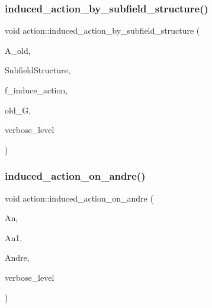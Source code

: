 \mbox{\label{classaction_add42951bdab176ceed6cc4af05dfa948}} 
\subsubsection{\texorpdfstring{induced\+\_\+action\+\_\+by\+\_\+subfield\+\_\+structure()}{induced\_action\_by\_subfield\_structure()}}
{\footnotesize\ttfamily void action\+::induced\+\_\+action\+\_\+by\+\_\+subfield\+\_\+structure (\begin{DoxyParamCaption}\item[{\mbox{\hyperlink{classaction}{action}} $\ast$}]{A\+\_\+old,  }\item[{\mbox{\hyperlink{classaction__by__subfield__structure}{action\+\_\+by\+\_\+subfield\+\_\+structure}} $\ast$}]{Subfield\+Structure,  }\item[{\mbox{\hyperlink{galois_8h_a09fddde158a3a20bd2dcadb609de11dc}{I\+NT}}}]{f\+\_\+induce\+\_\+action,  }\item[{\mbox{\hyperlink{classsims}{sims}} $\ast$}]{old\+\_\+G,  }\item[{\mbox{\hyperlink{galois_8h_a09fddde158a3a20bd2dcadb609de11dc}{I\+NT}}}]{verbose\+\_\+level }\end{DoxyParamCaption})}

\mbox{\label{classaction_a917efe5d7ae49b86dbf397540939fea4}} 
\subsubsection{\texorpdfstring{induced\+\_\+action\+\_\+on\+\_\+andre()}{induced\_action\_on\_andre()}}
{\footnotesize\ttfamily void action\+::induced\+\_\+action\+\_\+on\+\_\+andre (\begin{DoxyParamCaption}\item[{\mbox{\hyperlink{classaction}{action}} $\ast$}]{An,  }\item[{\mbox{\hyperlink{classaction}{action}} $\ast$}]{An1,  }\item[{\mbox{\hyperlink{classandre__construction}{andre\+\_\+construction}} $\ast$}]{Andre,  }\item[{\mbox{\hyperlink{galois_8h_a09fddde158a3a20bd2dcadb609de11dc}{I\+NT}}}]{verbose\+\_\+level }\end{DoxyParamCaption})}

